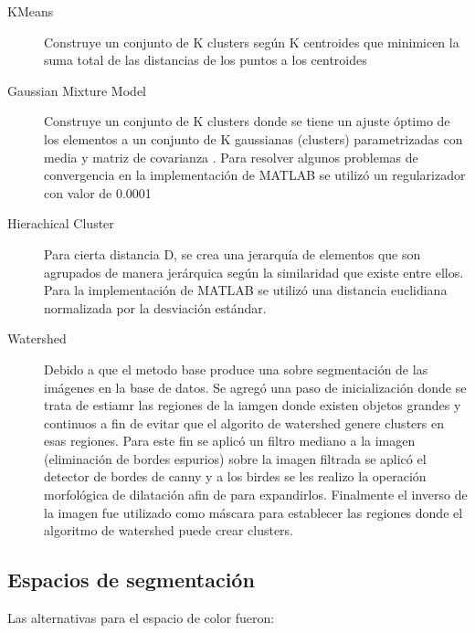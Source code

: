 \documentclass[10pt,twocolumn,letterpaper]{article}
\begin{document}
\begin{description}
\item[KMeans] Construye un conjunto de K clusters según K centroides que minimicen la suma total de las distancias de los puntos a los centroides 

\item[Gaussian Mixture Model] Construye un conjunto de K clusters donde se tiene un ajuste óptimo de los elementos a un conjunto de K gaussianas (clusters) parametrizadas con media  y matriz de covarianza . Para resolver algunos problemas de convergencia en la implementación de MATLAB se utilizó un regularizador con valor de 0.0001

\item[Hierachical Cluster] Para cierta distancia D, se crea una jerarquía de elementos que son agrupados de manera jerárquica según la similaridad que existe entre ellos. Para la implementación de MATLAB se utilizó una distancia euclidiana normalizada por la desviación estándar.

\item[Watershed] Debido a que el metodo base produce una sobre segmentación  de las imágenes en la base de datos. Se agregó una paso de inicialización donde se trata de estiamr las regiones de la iamgen donde existen objetos grandes y continuos a fin de evitar que el algorito de watershed genere clusters en esas regiones. Para este fin  se aplicó un filtro mediano a la imagen (eliminación de bordes espurios) sobre la imagen filtrada se aplicó el detector de bordes de canny y a los birdes se les realizo la operación morfológica de dilatación afin de para expandirlos.  Finalmente el inverso de la imagen fue utilizado como máscara para establecer las regiones donde el algoritmo de  watershed puede crear clusters.

\end{description}


\subsection{Espacios de segmentación}
Las alternativas para el espacio de color fueron:
\end{document}
